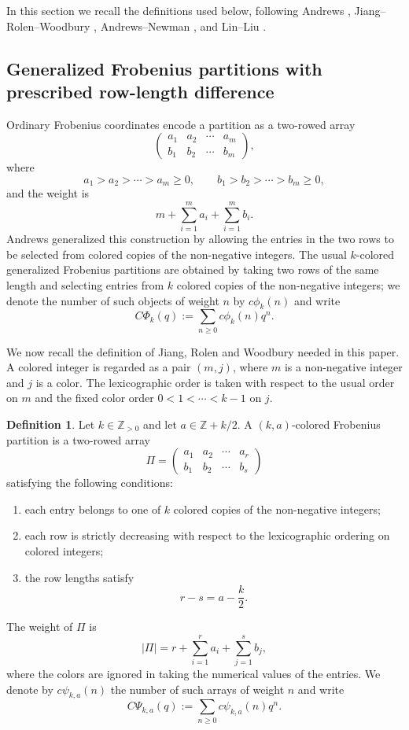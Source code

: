 \documentclass[12pt]{amsart}
\theoremstyle{definition}
\newtheorem{definition}[theorem]{Definition}
\theoremstyle{remark}
\numberwithin{equation}{section}
\newcommand{\cpsi}{c\psi}
\newcommand{\CPsi}{C\Psi}
\begin{document}
In this section we recall the definitions used below, following Andrews \cite{AndrewsGFP}, Jiang--Rolen--Woodbury \cite{JiangRolenWoodbury}, Andrews--Newman \cite{AndrewsNewman}, and Lin--Liu \cite{LinLiu}.

\subsection{Generalized Frobenius partitions with prescribed row-length difference}

Ordinary Frobenius coordinates encode a partition as a two-rowed array
\[
\begin{pmatrix}
 a_1&a_2&\cdots&a_m\\
 b_1&b_2&\cdots&b_m
\end{pmatrix},
\]
where
\[
a_1>a_2>\cdots>a_m\geq 0,
\qquad
b_1>b_2>\cdots>b_m\geq 0,
\]
and the weight is
\[
m+\sum_{i=1}^m a_i+\sum_{i=1}^m b_i.
\]
Andrews \cite{AndrewsGFP} generalized this construction by allowing the entries in the two rows to be selected from colored copies of the non-negative integers.  The usual $k$-colored generalized Frobenius partitions are obtained by taking two rows of the same length and selecting entries from $k$ colored copies of the non-negative integers; we denote the number of such objects of weight $n$ by $c\phi_k(n)$ and write
\[
C\Phi_k(q):=\sum_{n\geq 0}c\phi_k(n)q^n.
\]

We now recall the definition of Jiang, Rolen and Woodbury \cite[Definition 1.5]{JiangRolenWoodbury} needed in this paper.  A colored integer is regarded as a pair $(m,j)$, where $m$ is a non-negative integer and $j$ is a color.  The lexicographic order is taken with respect to the usual order on $m$ and the fixed color order $0<1<\cdots<k-1$ on $j$.

\begin{definition}\label{def:kaF}
Let $k\in\mathbb Z_{>0}$ and let $a\in \mathbb Z+k/2$.  A $(k,a)$-colored Frobenius partition is a two-rowed array
\[
\Pi=
\begin{pmatrix}
 a_1&a_2&\cdots&a_r\\
 b_1&b_2&\cdots&b_s
\end{pmatrix}
\]
satisfying the following conditions:
\begin{enumerate}
\item each entry belongs to one of $k$ colored copies of the non-negative integers;
\item each row is strictly decreasing with respect to the lexicographic ordering on colored integers;
\item the row lengths satisfy
\[
r-s=a-\frac{k}{2}.
\]
\end{enumerate}
The weight of $\Pi$ is
\[
|\Pi|=r+\sum_{i=1}^r a_i+\sum_{j=1}^s b_j,
\]
where the colors are ignored in taking the numerical values of the entries.  We denote by $\cpsi_{k,a}(n)$ the number of such arrays of weight $n$ and write
\[
\CPsi_{k,a}(q):=\sum_{n\geq 0}\cpsi_{k,a}(n)q^n.
\]
\end{definition}
\end{document}
